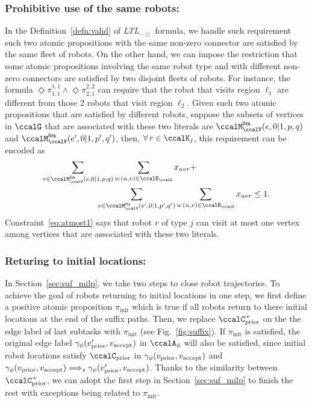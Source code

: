 \documentclass[Afour,sageh,times]{sagej}
\newcommand{\ltl}{ {\it LTL}$_{-\bigcirc}$ }
\newcommand{\autop}{\ccalA_{\phi}}
\newcommand{\vertex}[1]{v_{\textup{#1}}}
\newcommand{\simplies}{\DOTSB\Longrightarrow}
\renewcommand{\ap}[3]{\mathcal{\pi}_{{#1},{#2}}^{#3}}
\begin{document}
{\subsubsection{Prohibitive use of the same robots:} In the Definition~\ref{defn:valid} of \ltl formula, we handle such requirement such two atomic propositions with the same non-zero connector are satisfied by the same fleet of robots. On the other hand, we can impose the restriction that some atomic propositions involving the same robot type and with different non-zero connectors are satisfied by two disjoint fleets of robots. For instance, the formula $\Diamond \ap{1}{1}{1,1} \wedge \Diamond \ap{2}{1}{2,2}$ can require that the robot that visits region $\ell_1$ are different from those 2 robots that visit region $\ell_2$. Given such two atomic propositions that are satisfied by different robots, suppose the subsets of vertices in $\ccalG$ that are associated with these two literals are $\ccalM_{\ccalV}^\mathsf{lits} (e, 0|1, p, q)$ and $\ccalM_{\ccalV}^\mathsf{lits} (e', 0|1, p', q')$, then, $\forall \, r \in \ccalK_j$, this requirement can be encoded as
\begin{align}\label{eq:atmost1}
  \sum_{v\in \ccalM_{\ccalV}^\mathsf{lits} (e, 0|1, p, q)} & \sum_{u: (u,v) \in \ccalE_\ccalG} x_{uvr} + \nonumber \\
 & \hspace{-2em}  \sum_{v\in \ccalM_{\ccalV}^\mathsf{lits} (e', 0|1, p', q')} \sum_{u: (u,v) \in \ccalE_\ccalG}  x_{uvr} \leq 1.
\end{align}
Constraint~\eqref{eq:atmost1} says that robot $r$ of type $j$ can visit at most one vertex among vertices that are associated with these two literals.


\subsubsection{Returing to initial locations:}\label{app:loop}
In Section~\ref{sec:suf_milp}, we take two steps to close robot trajectories. To achieve the goal of robots returning to initial locations in one step, we first define a positive atomic proposition $\pi_{\text{init}}$ which is true if all robots return to there initial locations at the end of the suffix paths. Then, we replace $\ccalC_{\text{prior}}^+$ on the the edge label of last subtasks with $\pi_{\text{init}}$ (see Fig.~\ref{fig:suffix}). If $\pi_{\text{init}}$ is satisfied, the original edge label $ \gamma_\phi(\vertex{prior}', \vertex{accept})$ in $\autop$ will also be satisfied, since initial robot locations satisfy $\ccalC_{\text{prior}}$ in $\gamma_\phi(\vertex{prior}, \vertex{accept})$ and $\gamma_\phi(\vertex{prior}, \vertex{accept}) \simplies_s \gamma_\phi(\vertex{prior}', \vertex{accept})$. Thanks to the similarity between $\ccalC_{\text{prior}}^+$, we can adopt the first step in Section~\ref{sec:suf_milp} to finish the rest with exceptions being related to $\pi_{\text{init}}$.

}
\end{document}
